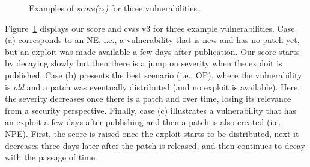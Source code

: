 \begin{figure}[h]
\caption{Examples of \emph{score(v$_i$)} for three vulnerabilities.}
\label{fig:scoreplot}
\end{figure}


Figure~\ref{fig:scoreplot} displays our score and \gls{cvss} v3 for three example vulnerabilities. 
Case (a) corresponds to an NE, i.e., a vulnerability that is new and has no patch yet, but an exploit was made available a few days after publication. 
Our score starts by decaying slowly but then there is a jump on severity when the exploit is published.
Case (b) presents the best scenario (i.e., OP), where the vulnerability is \emph{old} and a patch was eventually distributed (and no exploit is available). Here, the severity decreases once there is a patch and over time, losing its relevance from a security perspective. 
Finally, case (c) illustrates a vulnerability that has an exploit a few days after publishing and then a patch is also created (i.e., NPE).
First, the score is raised once the exploit starts to be distributed, next it decreases three days later after the patch is released, and then continues to decay with the passage of time.


